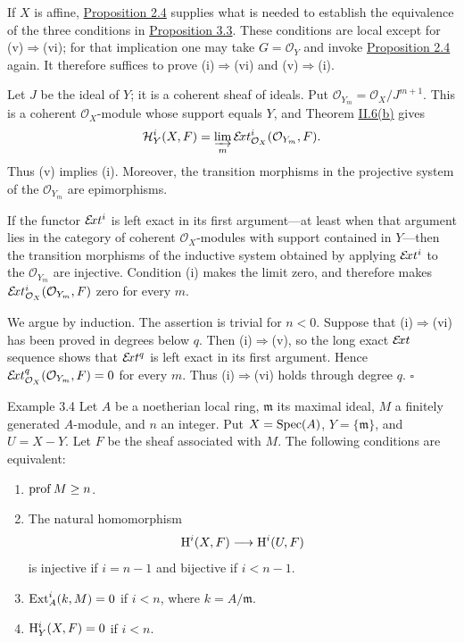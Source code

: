 If $X$ is affine, \hyperref[III.2.4]{Proposition 2.4} supplies what is needed to establish the
equivalence of the three conditions in \hyperref[III.3.3]{Proposition 3.3}. These conditions are
local except for (v)$\Rightarrow$(vi); for that implication one may take
$G=\mathcal O_Y$ and invoke \hyperref[III.2.4]{Proposition 2.4} again. It therefore suffices to
prove (i)$\Rightarrow$(vi) and (v)$\Rightarrow$(i).

Let $J$ be the ideal of $Y$; it is a coherent sheaf of ideals. Put
$\mathcal O_{Y_m}=\mathcal O_X/J^{m+1}$. This is a coherent
$\mathcal O_X$-module whose support equals $Y$, and Theorem \hyperref[II.6]{II.6(b)} gives
\[
  \mathcal H_Y^i(X,F)=\varinjlim_m
  \mathcal E\!xt_{\mathcal O_X}^i(\mathcal O_{Y_m},F).
\]
Thus (v) implies (i). Moreover, the transition morphisms in the
projective system of the $\mathcal O_{Y_m}$ are epimorphisms.

If the functor $\mathcal E\!xt^i$ is left exact in its first argument---at least when
that argument lies in the category of coherent $\mathcal O_X$-modules with
support contained in $Y$---then the transition morphisms of the inductive
system obtained by applying $\mathcal E\!xt^i$ to the $\mathcal O_{Y_m}$ are
injective. Condition (i) makes the limit zero, and therefore makes
$\mathcal E\!xt_{\mathcal O_X}^i(\mathcal O_{Y_m},F)$ zero for every $m$.

We argue by induction. The assertion is trivial for $n<0$. Suppose that
(i)$\Rightarrow$(vi) has been proved in degrees below $q$. Then
(i)$\Rightarrow$(v), so the long exact $\mathcal E\!xt$ sequence shows that
$\mathcal E\!xt^q$ is left exact in its first argument. Hence
$\mathcal E\!xt_{\mathcal O_X}^q(\mathcal O_{Y_m},F)=0$ for every $m$. Thus
(i)$\Rightarrow$(vi) holds through degree $q$.
\hfill$\square$\par

\begin{sgastatement}{Example 3.4}
Let $A$ be a noetherian local ring, $\mathfrak m$ its maximal ideal, $M$ a
finitely generated $A$-module, and $n$ an integer. Put
$X=\operatorname{Spec}(A)$, $Y=\{\mathfrak m\}$, and $U=X-Y$. Let $F$ be the sheaf associated
with $M$. The following conditions are equivalent:
\begin{enumerate}[label=\textup{(\arabic*)},leftmargin=2.8em]
\item $\operatorname{prof} M\ge n$.
\item The natural homomorphism
\[
  \mathrm H^i(X,F)\longrightarrow\mathrm H^i(U,F)
\]
is injective if $i=n-1$ and bijective if $i<n-1$.
\item $\operatorname{Ext}_A^i(k,M)=0$ if $i<n$, where $k=A/\mathfrak m$.
\item $\mathrm H_Y^i(X,F)=0$ if $i<n$.
\end{enumerate}
\end{sgastatement}

